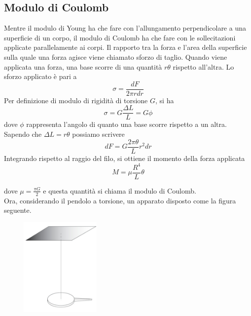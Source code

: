 \documentclass[a4paper]{article}
\begin{document}
\subsection{Modulo di Coulomb}
Mentre il modulo di Young ha che fare con l'allungamento perpendicolare a una superficie di un corpo, il modulo di Coulomb ha che fare con le sollecitazioni applicate parallelamente ai corpi. Il rapporto tra la forza e l'area della superficie sulla quale una forza agisce viene chiamato sforzo di taglio. Quando viene applicata una forza, una base scorre di una quantità $r\theta$ rispetto all'altra. Lo sforzo applicato è pari a 
\begin{equation}
    \sigma = \frac{dF}{2\pi r dr}
\end{equation}
Per definizione di modulo di rigidità di torsione $G$, si ha
\begin{equation}
    \sigma = G\frac{\Delta L}{L} = G \phi
\end{equation}
dove $\phi$ rappresenta l'angolo di quanto una base scorre rispetto a un altra. Sapendo che $\Delta L = r\theta$ possiamo scrivere 
\begin{equation}
    dF = G \frac{2\pi \theta}{L} r^2 dr
\end{equation}
Integrando rispetto al raggio del filo, si ottiene il momento della forza applicata
\begin{equation}
    M = \mu \frac{R^4}{L} \theta
\end{equation}

dove $\mu = \frac{\pi G}{2}$ e questa quantità si chiama il modulo di Coulomb.
\\Ora, considerando il pendolo a torsione, un apparato disposto come la figura seguente. 
\begin{figure}
    \begin{center}
    \includegraphics[width=0.35\textwidth, trim={0 3cm 0 0}]{fotocoulomb/pendolotorsione.jpg}
    \end{center}
\end{figure}
\end{document}
